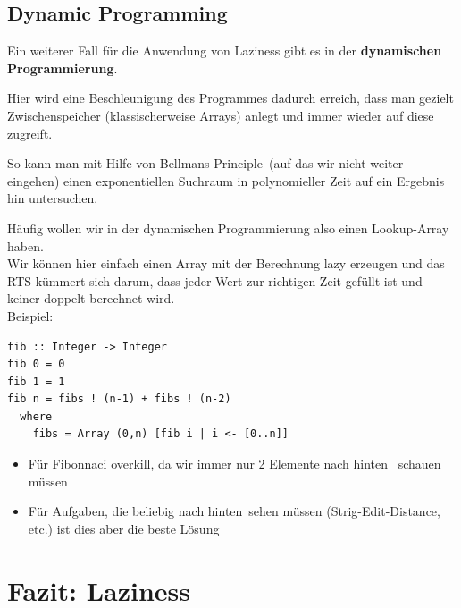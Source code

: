 \documentclass{beamer}
\begin{document}
\subsection{Dynamic Programming}

\begin{frame}[fragile]
Ein weiterer Fall für die Anwendung von Laziness gibt es in der \textbf{dynamischen Programmierung}.\\\par\pause
Hier wird eine Beschleunigung des Programmes dadurch erreich, dass man gezielt Zwischenspeicher (klassischerweise Arrays) anlegt und immer wieder auf diese zugreift.\\\par\pause
So kann man mit Hilfe von \glqq Bellmans Principle\grqq \ (auf das wir nicht weiter eingehen) einen exponentiellen Suchraum in polynomieller Zeit auf ein Ergebnis hin untersuchen.
\end{frame}

\begin{frame}[fragile]
Häufig wollen wir in der dynamischen Programmierung also einen Lookup-Array haben.\\\pause
Wir können hier einfach einen Array mit der Berechnung lazy erzeugen und das RTS kümmert sich darum, dass jeder Wert zur richtigen Zeit gefüllt ist und keiner doppelt berechnet wird.\\\pause
Beispiel:
\begin{verbatim}
fib :: Integer -> Integer
fib 0 = 0
fib 1 = 1
fib n = fibs ! (n-1) + fibs ! (n-2)
  where
    fibs = Array (0,n) [fib i | i <- [0..n]]
\end{verbatim}
\pause
\begin{itemize}
 \item Für Fibonnaci overkill, da wir immer nur 2 Elemente \glqq nach hinten \grqq \ schauen müssen
 \pause
 \item Für Aufgaben, die beliebig \glqq nach hinten\grqq \ sehen müssen (Strig-Edit-Distance, etc.) ist dies aber die beste Lösung
\end{itemize}

\end{frame}

\section{Fazit: Laziness}
\end{document}

